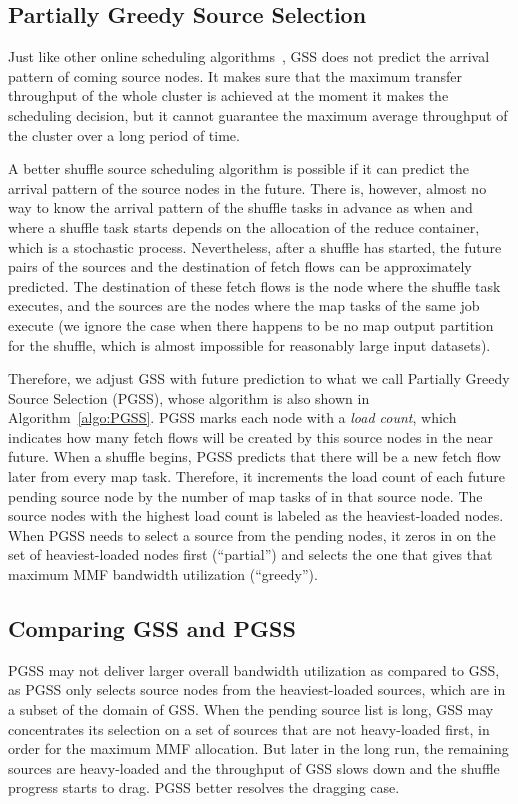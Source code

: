 \documentclass[10pt,journal,compsoc]{IEEEtran}
\begin{document}
\subsection{Partially Greedy Source Selection}
Just like other online scheduling algorithms~\cite{wu2007scheduling, sgall1998line}, 
GSS does not predict the arrival pattern of coming source nodes. 
It makes sure that the maximum transfer throughput of the whole
cluster is achieved at the moment it makes the scheduling decision,
but it cannot guarantee the maximum average throughput of the cluster
over a long period of time.

A better shuffle source scheduling algorithm is possible if it can
predict the arrival pattern of the source nodes in the future. %
There is, however, almost no way to know the arrival pattern of the shuffle
tasks in advance
as when and where a shuffle task starts depends on the allocation of
the reduce container, which is a stochastic process.
Nevertheless, after a shuffle has started, the future pairs of the
sources and the destination of fetch flows can be approximately predicted.
The destination of these fetch flows is the node where the shuffle task
executes,
and the sources are the nodes %
where 
the map tasks of the same job execute 
(we ignore the case when there happens to be no map output partition
for the shuffle, which is almost impossible
for reasonably large input datasets). 

Therefore, we adjust GSS with future prediction to what we call Partially
Greedy Source Selection (PGSS), whose algorithm is also shown in Algorithm~\ref{algo:PGSS}.
PGSS marks each node with a \emph{load count}, which indicates how many fetch flows will be created by
this source nodes in the near future.
When a shuffle begins, PGSS predicts that there will be a new fetch
flow later from every map task.
Therefore, it increments the load count of each future pending
source node by the number of map tasks of in that source node.
The source nodes with the highest load count is labeled as the heaviest-loaded nodes.
When PGSS needs to select a source from the pending nodes, 
it zeros in on the set of heaviest-loaded nodes first (``partial'') and selects the one that gives that maximum MMF
bandwidth utilization (``greedy'').

\subsection{Comparing GSS and PGSS}
PGSS may not deliver larger overall bandwidth utilization as compared to GSS, 
as PGSS only selects source nodes from the heaviest-loaded
sources, which are in a subset of the domain of GSS.
When the pending source list is long, GSS may concentrates its selection on 
a set of sources that are not heavy-loaded first, in order for the maximum MMF allocation. 
But later in the long run, the remaining sources are heavy-loaded and the throughput of GSS
slows down and the shuffle progress starts to drag. 
PGSS better resolves the dragging case. 
\end{document}

